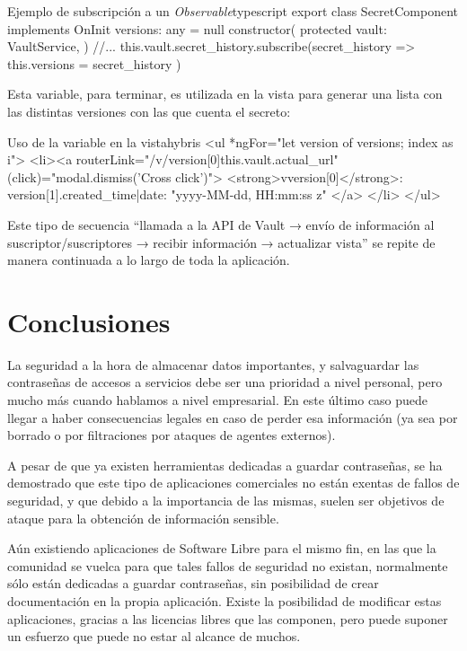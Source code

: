\documentclass{\ClassPath/viu-tfm-template}
\begin{document}
\begin{mycode}{Ejemplo de subscripción a un \textit{Observable}}{typescript}{}
export class SecretComponent implements OnInit {
    versions: any = null
    constructor(
        protected vault: VaultService,
    ) {
        //...
        this.vault.secret_history.subscribe(secret_history => {
            this.versions = secret_history
        })
    }
}
\end{mycode}

Esta variable, para terminar, es utilizada en la vista para generar una lista con las distintas versiones con las que cuenta el secreto:

\begin{mycode}{Uso de la variable  en la vista}{hybris}{}
<ul *ngFor="let version of versions; index as i">
  <li><a routerLink="/v/{{version[0]}}{{this.vault.actual_url}}"
    (click)="modal.dismiss('Cross click')">
      <strong>v{{version[0]}}</strong>:
        {{version[1].created_time|date: "yyyy-MM-dd, HH:mm:ss z"}}
    </a>
  </li>
</ul>
\end{mycode}

Este tipo de secuencia “llamada a la API de Vault → envío de información al suscriptor/suscriptores → recibir información → actualizar vista” se repite de manera continuada a lo largo de toda la aplicación.


\vfill
\pagebreak
\chapter{Conclusiones}

La seguridad a la hora de almacenar datos importantes, y salvaguardar las contraseñas de accesos a servicios debe ser una prioridad a nivel personal, pero mucho más cuando hablamos a nivel empresarial. En este último caso puede llegar a haber consecuencias legales en caso de perder esa información (ya sea por borrado o por filtraciones por ataques de agentes externos).

A pesar de que ya existen herramientas dedicadas a guardar contraseñas, se ha demostrado que este tipo de aplicaciones comerciales no están exentas de fallos de seguridad, y que debido a la importancia de las mismas, suelen ser objetivos de ataque para la obtención de información sensible.

Aún existiendo aplicaciones de Software Libre para el mismo fin, en las que la comunidad se vuelca para que tales fallos de seguridad no existan, normalmente sólo están dedicadas a guardar contraseñas, sin posibilidad de crear documentación en la propia aplicación. Existe la posibilidad de modificar estas aplicaciones, gracias a las licencias libres que las componen, pero puede suponer un esfuerzo que puede no estar al alcance de muchos.
\end{document}
